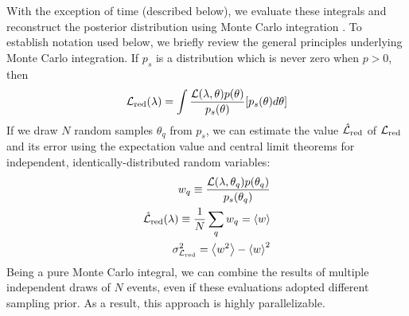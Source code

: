 With the exception of time (described below), we evaluate these integrals and reconstruct the posterior distribution using Monte Carlo integration
\cite{book-mm-NumericalRecipies,peter1978new}.   To establish notation used below, we briefly review the general principles  underlying Monte Carlo
integration.  If $p_s$ is a distribution which is never zero when $p>0$, then 
\begin{eqnarray}
{{\cal L}_{\rm red}}(\lambda) = \int \frac{{\cal L}(\lambda,\theta) p(\theta)}{p_s(\theta)} [p_s(\theta) d\theta]
\end{eqnarray}
% 
If we draw $N$ random samples $\theta_q$ from $p_s$, we can estimate the value $\hat{{\cal L}}_{\rm red}$ of ${{\cal L}_{\rm red}}$ and its error using the
expectation value and central limit theorems for independent, identically-distributed random variables:
\begin{eqnarray}
w_q \equiv \frac{{\cal L}(\lambda,\theta_q) p(\theta_q)}{p_s(\theta_q)} \\
\hat{{\cal L}}_{\rm red}(\lambda) \equiv \frac{1}{N} \sum_q w_q = \left<w\right> \\
\sigma_{{{\cal L}_{\rm red}}}^2 = \left<w^2\right> - \left<w\right>^2
\end{eqnarray}
Being a pure Monte Carlo integral, we can  combine the results of multiple independent draws of $N$ events, even if these
evaluations adopted different sampling prior.  As a result, this approach is highly parallelizable.  


